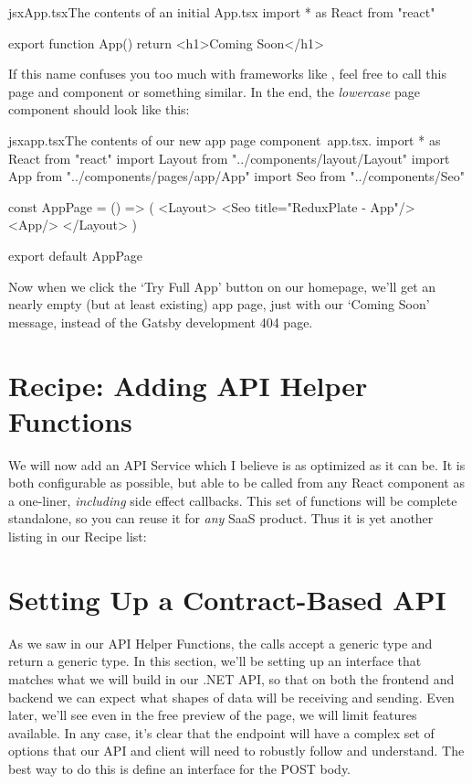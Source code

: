 \documentclass[paper=6in:9in,pagesize=pdftex,headinclude=on,footinclude=on,12pt]{scrbook}
\begin{document}
\begin{codeInput}{jsx}{App.tsx}{The contents of an initial App.tsx}
import * as React from "react"

export function App() {
  return <h1>Coming Soon</h1>
} 
\end{codeInput}

If this name  confuses you too much with frameworks like , feel free to call this page and component  or something similar. In the end, the \textit{lowercase} page component  should look like this:

\begin{codeInput}{jsx}{app.tsx}{The contents of our new app page component\, app.tsx.}
import * as React from "react"
import Layout from "../components/layout/Layout"
import { App } from "../components/pages/app/App"
import Seo from "../components/Seo"

const AppPage = () => (
  <Layout>
    <Seo title="ReduxPlate - App"/>
    <App/>
  </Layout>
)

export default AppPage  
\end{codeInput}

Now when we click the `Try Full App' button on our homepage, we'll get an nearly empty (but at least existing) app page, just with our `Coming Soon' message, instead of the Gatsby development 404 page.

\section{Recipe: Adding API Helper Functions}

We will now add an API Service which I believe is as optimized as it can be. It is both configurable as possible, but able to be called from any React component as a one-liner, \textit{including} side effect callbacks. This set of functions will be complete standalone, so you can reuse it for \textit{any} SaaS product. Thus it is yet another listing in our Recipe list:

\section{Setting Up a Contract-Based API}

As we saw in our API Helper Functions, the calls accept a generic type and return a generic type. In this section, we'll be setting up an interface that matches what we will build in our .NET API, so that on both the frontend and backend we can expect what shapes of data will be receiving and sending. Even later, we'll see even in the free preview of the  page, we will limit features available. In any case, it's clear that the  endpoint will have a complex set of options that our API and client will need to robustly follow and understand. The best way to do this is define an interface for the POST body.
\end{document}
